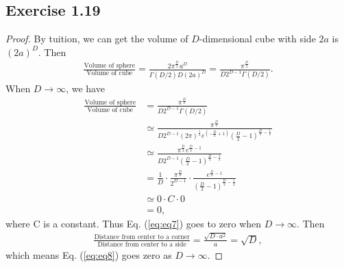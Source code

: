 \documentclass[11pt]{article}
\theoremstyle{definition}
\begin{document}
\subsection{Exercise 1.19}
\begin{proof}
By tuition, we can get the volume of $D$-dimensional cube with side $2a$ is $(2a)^{D}$. Then
\begin{align}
\frac{\text{Volume of sphere}}{\text{Volume of cube}} = \frac{2\pi^{\frac{D}{2}}a^D}{\Gamma\left(D/2\right)D(2a)^{D}} = \frac{\pi^{\frac{D}{2}}}{D2^{D-1}\Gamma(D/2)}. \label{eq:eq7}
\end{align}
When $D \rightarrow \infty$, we have
\begin{align*}
\frac{\text{Volume of sphere}}{\text{Volume of cube}} 
&= \frac{\pi^{\frac{D}{2}}}{D2^{D-1}\Gamma(D/2)} \\
&\simeq \frac{\pi^{\frac{D}{2}}}{D2^{D-1}(2\pi)^{\frac{1}{2}}e^{\left(-\frac{D}{2}+1\right)}\left(\frac{D}{2}-1\right)^{\frac{D}{2}-\frac{1}{2}}}\\
&\simeq \frac{\pi^{\frac{D}{2}}e^{\frac{D}{2}-1}}{D2^{D-1}\left(\frac{D}{2}-1\right)^{\frac{D}{2}-\frac{1}{2}}}\\
&= \frac{1}{D} \cdot \frac{\pi^{\frac{D}{2}}}{2^{D-1}} \cdot \frac{e^{\frac{D}{2}-1}}{\left(\frac{D}{2}-1\right)^{\frac{D}{2}-\frac{1}{2}}} \\
&\simeq 0 \cdot C \cdot 0\\
&= 0,
\end{align*}
where C is a constant. Thus Eq. (\ref{eq:eq7}) goes to zero when $D\rightarrow \infty$. Then
\begin{align}
\frac{\text{Distance from center to a corner}}{\text{Distance from center to a side}} = \frac{\sqrt{D\cdot a^2}}{a} = \sqrt{D}, \label{eq:eq8}
\end{align}
which means Eq. (\ref{eq:eq8}) goes zero as $D\rightarrow \infty$.
\end{proof}
\end{document}
